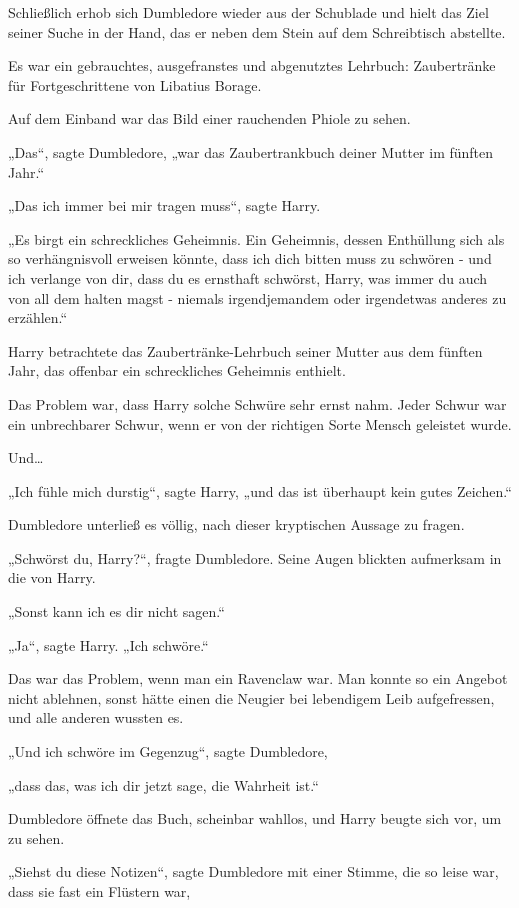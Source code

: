 {Schließlich erhob sich Dumbledore wieder aus der Schublade und hielt das Ziel seiner Suche in der Hand, das er neben dem Stein auf dem Schreibtisch abstellte.

Es war ein gebrauchtes, ausgefranstes und abgenutztes Lehrbuch: Zaubertränke für Fortgeschrittene von Libatius Borage.

Auf dem Einband war das Bild einer rauchenden Phiole zu sehen.

„Das“, sagte Dumbledore, „war das Zaubertrankbuch deiner Mutter im fünften Jahr.“

„Das ich immer bei mir tragen muss“, sagte Harry.

„Es birgt ein schreckliches Geheimnis. Ein Geheimnis, dessen Enthüllung sich als so verhängnisvoll erweisen könnte, dass ich dich bitten muss zu schwören - und ich verlange von dir, dass du es ernsthaft schwörst, Harry, was immer du auch von all dem halten magst - niemals irgendjemandem oder irgendetwas anderes zu erzählen.“

Harry betrachtete das Zaubertränke-Lehrbuch seiner Mutter aus dem fünften Jahr, das offenbar ein schreckliches Geheimnis enthielt.

Das Problem war, dass Harry solche Schwüre sehr ernst nahm. Jeder Schwur war ein unbrechbarer Schwur, wenn er von der richtigen Sorte Mensch geleistet wurde.

Und…

„Ich fühle mich durstig“, sagte Harry, „und das ist überhaupt kein gutes Zeichen.“

Dumbledore unterließ es völlig, nach dieser kryptischen Aussage zu fragen.

„Schwörst du, Harry?“, fragte Dumbledore. Seine Augen blickten aufmerksam in die von Harry.

„Sonst kann ich es dir nicht sagen.“

„Ja“, sagte Harry. „Ich schwöre.“

Das war das Problem, wenn man ein Ravenclaw war. Man konnte so ein Angebot nicht ablehnen, sonst hätte einen die Neugier bei lebendigem Leib aufgefressen, und alle anderen wussten es.

„Und ich schwöre im Gegenzug“, sagte Dumbledore,

„dass das, was ich dir jetzt sage, die Wahrheit ist.“

Dumbledore öffnete das Buch, scheinbar wahllos, und Harry beugte sich vor, um zu sehen.

„Siehst du diese Notizen“, sagte Dumbledore mit einer Stimme, die so leise war, dass sie fast ein Flüstern war,

}
